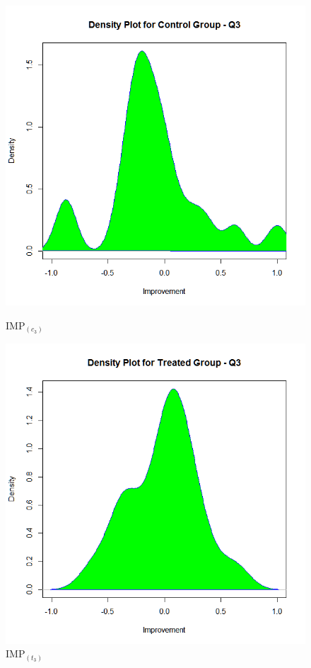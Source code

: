 \begin{figure}
	\centering
	\begin{minipage}{.5\textwidth}
		\centering
		\includegraphics[width=1\linewidth]{figures/Imp_Control-q3}
		\caption{IMP$_{(c_3)}$}
		\label{fig:Imp_Control-q3}
	\end{minipage}%
	\begin{minipage}{.5\textwidth}
		\centering
		\includegraphics[width=1\linewidth]{figures/Imp_Treated-q3}
		\caption{IMP$_{(t_3)}$}
		\label{fig:Imp_Treated-q3}
	\end{minipage}
\end{figure}

